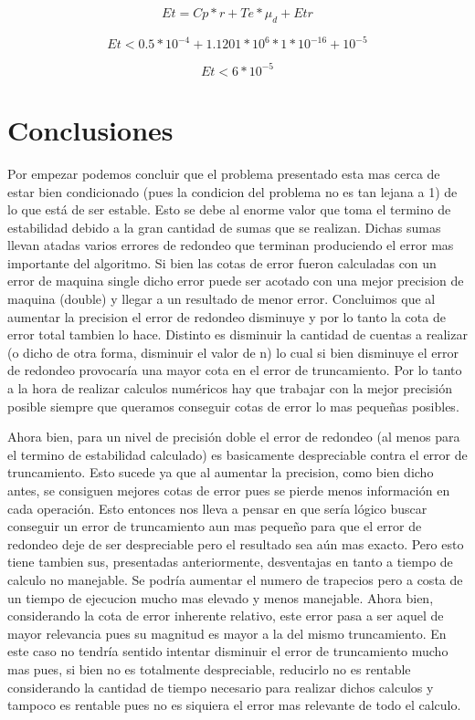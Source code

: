 \documentclass[11pt,a4paper]{article}
\begin{document}
\[ Et = Cp * r + Te * \mu_d + Etr \]

\[ Et < 0.5*10^{-4} + 1.1201*10^6 * 1*10^{-16} + 10^{-5} \]

\[ Et < 6*10^{-5}\]

\section{Conclusiones}

Por empezar podemos concluir que el problema presentado esta mas cerca de estar bien condicionado (pues la condicion del problema no es tan lejana a 1) de lo que está de ser estable. Esto se debe al enorme valor que toma el termino de estabilidad debido a la gran cantidad de sumas que se realizan. Dichas sumas llevan atadas varios errores de redondeo que terminan produciendo el error mas importante del algoritmo. Si bien las cotas de error fueron calculadas con un error de maquina single dicho error puede ser acotado con una mejor precision de maquina (double) y llegar a un resultado de menor error. Concluimos que al aumentar la precision el error de redondeo disminuye y por lo tanto la cota de error total tambien lo hace. Distinto es disminuir la cantidad de cuentas a realizar (o dicho de otra forma, disminuir el valor de n) lo cual si bien disminuye el error de redondeo provocaría una mayor cota en el error de truncamiento. Por lo tanto a la hora de realizar calculos numéricos hay que trabajar con la mejor precisión posible siempre que queramos conseguir cotas de error lo mas pequeñas posibles.

Ahora bien, para un nivel de precisión doble el error de redondeo (al menos para el termino de estabilidad calculado) es basicamente despreciable contra el error de truncamiento. Esto sucede ya que al aumentar la precision, como bien dicho antes, se consiguen mejores cotas de error pues se pierde menos información en cada operación. Esto entonces nos lleva a pensar en que sería lógico buscar conseguir un error de truncamiento aun mas pequeño para que el error de redondeo deje de ser despreciable pero el resultado sea aún mas exacto. Pero esto tiene tambien sus, presentadas anteriormente, desventajas en tanto a tiempo de calculo no manejable. Se podría aumentar el numero de trapecios pero a costa de un tiempo de ejecucion mucho mas elevado y menos manejable. Ahora bien, considerando la cota de error inherente relativo, este error pasa a ser aquel de mayor relevancia pues su magnitud es mayor a la del mismo truncamiento. En este caso no tendría sentido intentar disminuir el error de truncamiento mucho mas pues, si bien no es totalmente despreciable, reducirlo no es rentable considerando la cantidad de tiempo necesario para realizar dichos calculos y tampoco es rentable pues no es siquiera el error mas relevante de todo el calculo.
\end{document}
